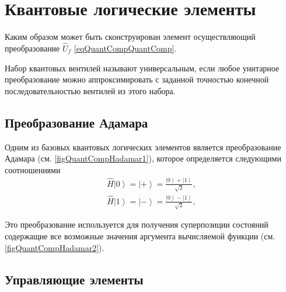 \section{Квантовые логические элементы}
Каким образом может быть сконструирован элемент осуществляющий
преобразование $\hat{U}_f$ \eqref{eqQuantCompQuantComp}.

Набор квантовых вентилей называют универсальным, если любое унитарное
преобразование можно аппроксимировать с заданной точностью конечной
последовательностью вентилей из этого набора.

\subsection{Преобразование Адамара}

Одним из базовых квантовых логических элементов является
преобразование Адамара (см. \autoref{figQuantCompHadamar1}), которое
определяется следующими соотношениями
\begin{eqnarray}
\hat{H} \left|0\right> = \left|+\right> =  
\frac{\left|0\right> + \left|1\right> }{\sqrt{2}},
\nonumber \\
\hat{H} \left|1\right> = \left|-\right> = 
\frac{\left|0\right> - \left|1\right> }{\sqrt{2}},
\nonumber
\end{eqnarray}



Это преобразование используется для получения суперпозиции состояний
содержащие все возможные значения аргумента вычисляемой функции
(см. \autoref{figQuantCompHadamar2}). 



\subsection{Управляющие элементы}






 


